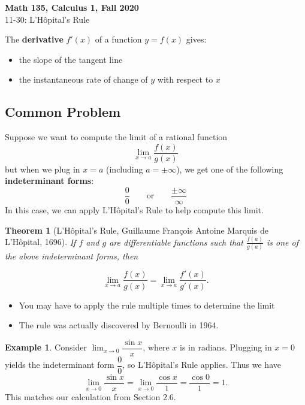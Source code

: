 \documentclass[11pt,reqno,final]{amsart}
\numberwithin{figure}{section}
\newtheorem{theorem}[equation]{Theorem}%
\theoremstyle{definition} %
\newtheorem{example}[equation]{Example}%
\newcommand{\dlim}{\displaystyle\lim}
\begin{document}
\begin{center}
        \textbf{\Large Math 135, Calculus 1, Fall 2020}\\[10pt]
        {\large 11-30: L'H\^{o}pital's Rule}
\end{center}

\thispagestyle{empty}


\renewcommand{\thesection}{\Alph{section}}


The \textbf{derivative} $f'(x)$ of a function $y=f(x)$ gives:
\begin{itemize}
\item the slope of the tangent line
\item the instantaneous rate of change of $y$ with respect to $x$
\end{itemize}

\subsection*{Common Problem} Suppose we want to compute the limit of a rational function
\[
        \dlim_{x \to a} \dfrac{f(x)}{g(x)}
\]
but when we plug in $x = a$ (including $a = \pm \infty$), we get one of the following \textbf{indeterminant forms}:
\[
        \dfrac{0}{0} \qquad \mbox{or} \qquad  \dfrac{\pm \infty}{\infty}
\]
In this case, we can apply L'H\^{o}pital's Rule to help compute this limit.\\
\begin{theorem}[L'H\^{o}pital's Rule, Guillaume Fran\c{c}ois Antoine Marquis de L'H\^{o}pital, 1696]
        If $f$ and $g$ are differentiable functions such that
        $\frac{f(a)}{g(a)}$
        is one of the above indeterminant forms, then
        \begin{framed}
                \[
                        \dlim_{x \to a} \dfrac{f(x)}{g(x)} = \dlim_{x \to a}\dfrac{f'(x)}{g'(x)}.
                \]
        \end{framed}
\end{theorem}

\begin{itemize}
\item You may have to apply the rule multiple times to determine the limit
\item The rule was actually discovered by Bernoulli in 1964.\\
\end{itemize}

\begin{example}
        Consider $\dlim_{x \to 0} \dfrac{\sin x}{x}$, where $x$ is in radians.
        Plugging in $x = 0$ yields the indeterminant form $\dfrac{0}{0}$, so L'H\^opital's Rule applies.
        Thus we have
        \[
                \dlim_{x \to 0} \dfrac{\sin x}{x} = \dlim_{x \to 0} \dfrac{\cos x}{1} = \dfrac{\cos 0}{1} = 1.
        \]
        This matches our calculation from Section 2.6.\\
\end{example}
\end{document}
